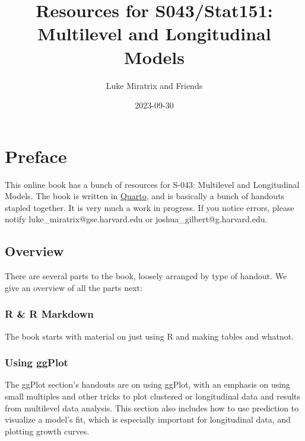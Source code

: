 \documentclass[
  letterpaper,
  DIV=11,
  numbers=noendperiod]{scrreprt}
\title{Resources for S043/Stat151: Multilevel and Longitudinal Models}
\author{Luke Miratrix and Friends}
\date{2023-09-30}
\renewcommand*\contentsname{Table of contents}
\newcommand\contentsname{Table of contents}
\begin{document}
\maketitle

\renewcommand*\contentsname{Table of contents}
{
\hypersetup{linkcolor=}
\setcounter{tocdepth}{2}
\tableofcontents
}

\chapter*{Preface}\label{preface}


This online book has a bunch of resources for S-043: Multilevel and
Longitudinal Models. The book is written in
\href{https://quarto.org/}{Quarto}, and is basically a bunch of handouts
stapled together. It is very much a work in progress. If you notice
errors, please notify luke\_miratrix@gse.harvard.edu or
joshua\_gilbert@g.harvard.edu.

\section*{Overview}\label{overview}


There are several parts to the book, loosely arranged by type of
handout. We give an overview of all the parts next:

\subsection*{R \& R Markdown}\label{r-r-markdown}

The book starts with material on just using R and making tables and
whatnot.

\subsection*{Using ggPlot}\label{using-ggplot}

The ggPlot section's handouts are on using ggPlot, with an emphasis on
using small multiples and other tricks to plot clustered or longitudinal
data and results from multilevel data analysis. This section also
includes how to use prediction to visualize a model's fit, which is
especially important for longitudinal data, and plotting growth curves.
\end{document}
